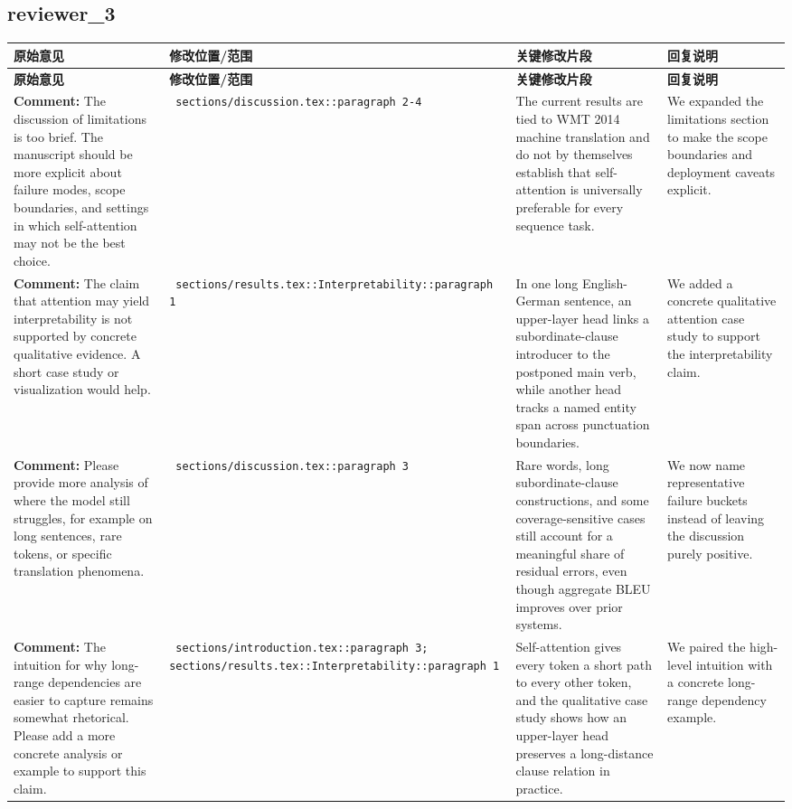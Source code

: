 \documentclass[11pt]{article}
\begin{document}
\subsection*{ reviewer\_3 }
\begin{longtable}{|p{}|p{}|p{}|p{}|}
\hline
\textbf{原始意见} & \textbf{修改位置/范围} & \textbf{关键修改片段} & \textbf{回复说明} \\
\hline
\endfirsthead
\hline
\textbf{原始意见} & \textbf{修改位置/范围} & \textbf{关键修改片段} & \textbf{回复说明} \\
\hline
\endhead
\textbf{Comment:} The discussion of limitations is too brief. The manuscript should be more explicit about failure modes, scope boundaries, and settings in which self-attention may not be the best choice. & \texttt{ sections/discussion.tex::paragraph 2-4 } & {\color{blue}\ttfamily The current results are tied to WMT 2014 machine translation and do not by themselves establish that self-attention is universally preferable for every sequence task.} & We expanded the limitations section to make the scope boundaries and deployment caveats explicit. \\
\hline
\textbf{Comment:} The claim that attention may yield interpretability is not supported by concrete qualitative evidence. A short case study or visualization would help. & \texttt{ sections/results.tex::Interpretability::paragraph 1 } & {\color{blue}\ttfamily In one long English-German sentence, an upper-layer head links a subordinate-clause introducer to the postponed main verb, while another head tracks a named entity span across punctuation boundaries.} & We added a concrete qualitative attention case study to support the interpretability claim. \\
\hline
\textbf{Comment:} Please provide more analysis of where the model still struggles, for example on long sentences, rare tokens, or specific translation phenomena. & \texttt{ sections/discussion.tex::paragraph 3 } & {\color{blue}\ttfamily Rare words, long subordinate-clause constructions, and some coverage-sensitive cases still account for a meaningful share of residual errors, even though aggregate BLEU improves over prior systems.} & We now name representative failure buckets instead of leaving the discussion purely positive. \\
\hline
\textbf{Comment:} The intuition for why long-range dependencies are easier to capture remains somewhat rhetorical. Please add a more concrete analysis or example to support this claim. & \texttt{ sections/introduction.tex::paragraph 3; sections/results.tex::Interpretability::paragraph 1 } & {\color{blue}\ttfamily Self-attention gives every token a short path to every other token, and the qualitative case study shows how an upper-layer head preserves a long-distance clause relation in practice.} & We paired the high-level intuition with a concrete long-range dependency example. \\

\end{longtable}
\end{document}
